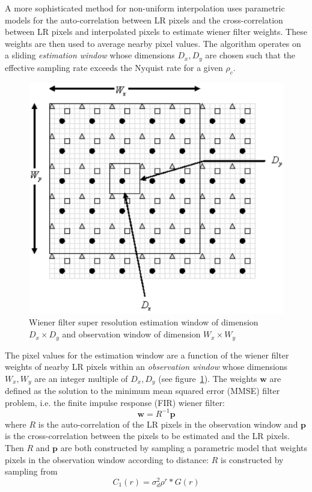 A more sophisticated method for non-uniform interpolation uses parametric models for the auto-correlation between LR pixels and the cross-correlation between LR pixels and interpolated pixels to estimate wiener filter weights\cite{wiener}.
%
These weights are then used to average nearby pixel values.
%
The algorithm operates on a sliding \textit{estimation window} whose dimensions $D_x, D_y$ are chosen such that the effective sampling rate exceeds the Nyquist rate for a given $\rho_c$.
\begin{figure}
    \centering
    \includegraphics[width=.7\linewidth]{figures/wiener.png}
    \caption{Wiener filter super resolution estimation window of dimension $D_x \times D_y$ and observation window of dimension $W_x \times W_y$\cite{wiener}}
    \label{fig:wiener}
\end{figure}
The pixel values for the estimation window are a function of the wiener filter weights of nearby LR pixels within an \textit{observation window} whose dimensions $W_x, W_y$ are an integer multiple of $D_x, D_y$ (see figure~\ref{fig:wiener}).
%
The weights $\bm{w}$ are defined as the solution to the minimum mean squared error (MMSE) filter problem, i.e. the finite impulse response (FIR) wiener filter:
\begin{equation}
    \bm{w} = R^{-1}\bm{p}
\end{equation}
where $R$ is the auto-correlation of the LR pixels in the observation window and $\bm{p}$ is the cross-correlation between the pixels to be estimated and the LR pixels.
%
Then $R$ and $\bm{p}$ are both constructed by sampling a parametric model that weights pixels in the observation window according to distance:
%
$R$ is constructed by sampling from
\begin{equation}
    C_1(r) = \sigma_{d}^2 \rho^{r} \ast G(r)
\end{equation}
